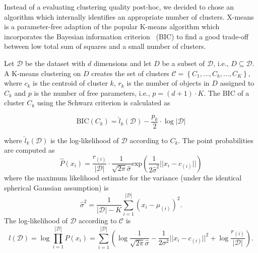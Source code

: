 \documentclass[
  oneside]{book}
\begin{document}
Instead of a evaluating clustering quality post-hoc, we decided to chose an algorithm which internally identifies an appropriate number of clusters.
X-means~\autocite{Pelleg:xmeans2000} is a parameter-free adaption of the popular K-means algorithm which incorporates the Bayesian information criterion~\autocite{Schwarz:BIC1978} (BIC) to find a good trade-off between low total sum of squares and a small number of clusters.

Let \(\mathcal{D}\) be the dataset with \(d\) dimensions and let \(D\) be a subset of \(\mathcal{D}\), i.e., \(D\subseteq \mathcal{D}\).
A K-means clustering on \(D\) creates the set of clusters
\(\mathcal{C}=\left\{C_1,\ldots,C_k,\ldots,C_K\right\}\), where \(c_k\) is the centroid of cluster \(k\), \(r_k\) is the number of objects in \(D\) assigned to \(C_k\) and \(p\) is the number of free parameters, i.e., \(p = (d+1) \cdot K\).
The BIC of a cluster \(C_k\) using the Schwarz criterion is calculated as

\begin{equation}
\text{BIC}(C_k) = \hat{l}_k(\mathcal{D}) - \frac{p_k}{2} \cdot \log |\mathcal{D}| 
\label{eq:06-bic}
\end{equation}

where \(\hat{l}_k(\mathcal{D})\) is the log-likelihood of \(\mathcal{D}\) according to \(C_k\).
The point probabilities are computed as
\begin{equation}
\hat{P}(x_i)=\frac{r_{(i)}}{|\mathcal{D}|}\cdot \frac{1}{\sqrt{2\pi}\hat{\sigma}}\text{exp}\left(\frac{1}{2\hat{\sigma}^2}||x_i-c_{(i)}||\right)
\label{eq:06-point-probs}
\end{equation}
where the maximum likelihood estimate for the variance (under the identical spherical Gaussian assumption) is
\begin{equation}
\hat{\sigma}^2=\frac{1}{|\mathcal{D}|-K}\sum_{i=1}^{|\mathcal{D}|}\left(x_i - \mu_{(i)}\right)^2.
\label{eq:06-mle}
\end{equation}
The log-likelihood of \(\mathcal{D}\) according to \(\mathcal{C}\) is
\begin{equation}
l(\mathcal{D})=\log\prod_{i=1}^{|\mathcal{D}|} P(x_i)=\sum_{i=1}^{|\mathcal{D}|}\left(\log \frac{1}{\sqrt{2\pi}\hat{\sigma}} - \frac{1}{2 \sigma^2} ||x_i-c_{(i)}||^2 + \log \frac{r_{(i)}}{|\mathcal{D}|}  \right).
\label{eq:06-log-likelihood}
\end{equation}
\end{document}
